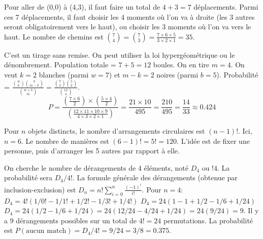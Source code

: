 
\begin{correctionbox}
Pour aller de (0,0) à (4,3), il faut faire un total de $4+3=7$ déplacements. Parmi ces 7 déplacements, il faut choisir les 4 moments où l'on va à droite (les 3 autres seront obligatoirement vers le haut), ou choisir les 3 moments où l'on va vers le haut.
Le nombre de chemins est $\binom{7}{4} = \binom{7}{3} = \frac{7 \times 6 \times 5}{3 \times 2 \times 1} = 35$.
\end{correctionbox}

\begin{correctionbox}
C'est un tirage sans remise. On peut utiliser la loi hypergéométrique ou le dénombrement.
Population totale = $7+5=12$ boules. On en tire $m=4$.
On veut $k=2$ blanches (parmi $w=7$) et $m-k=2$ noires (parmi $b=5$).
Probabilité = $\frac{\binom{w}{k} \binom{b}{m-k}}{\binom{w+b}{m}} = \frac{\binom{7}{2} \binom{5}{2}}{\binom{12}{4}}$.
$$ P = \frac{(\frac{7 \times 6}{2}) \times (\frac{5 \times 4}{2})}{(\frac{12 \times 11 \times 10 \times 9}{4 \times 3 \times 2 \times 1})} = \frac{21 \times 10}{495} = \frac{210}{495} = \frac{14}{33} \approx 0.424 $$
\end{correctionbox}

\begin{correctionbox}
Pour $n$ objets distincts, le nombre d'arrangements circulaires est $(n-1)!$.
Ici, $n=6$. Le nombre de manières est $(6-1)! = 5! = 120$.
L'idée est de fixer une personne, puis d'arranger les 5 autres par rapport à elle.
\end{correctionbox}

\begin{correctionbox}
On cherche le nombre de dérangements de 4 éléments, noté $D_4$ ou $!4$. La probabilité sera $D_4 / 4!$.
La formule générale des dérangements (obtenue par inclusion-exclusion) est $D_n = n! \sum_{i=0}^n \frac{(-1)^i}{i!}$.
Pour $n=4$:
$D_4 = 4! (1/0! - 1/1! + 1/2! - 1/3! + 1/4!)$
$D_4 = 24 (1 - 1 + 1/2 - 1/6 + 1/24)$
$D_4 = 24 (1/2 - 1/6 + 1/24) = 24 (12/24 - 4/24 + 1/24) = 24 (9/24) = 9$.
Il y a 9 dérangements possibles sur un total de $4! = 24$ permutations.
La probabilité est $P(\text{aucun match}) = D_4 / 4! = 9/24 = 3/8 = 0.375$.
\end{correctionbox}


